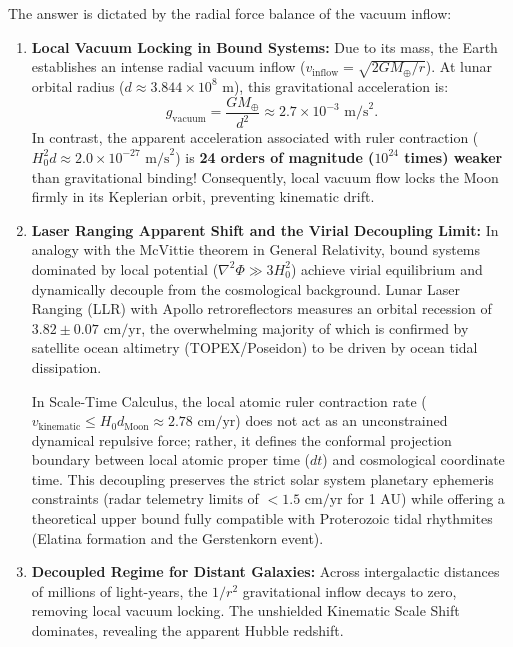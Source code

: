 \documentclass[11pt,a4paper]{article}
\begin{document}
The answer is dictated by the radial force balance of the vacuum inflow:
\begin{enumerate}
    \item \textbf{Local Vacuum Locking in Bound Systems:} Due to its mass, the Earth establishes an intense radial vacuum inflow ($v_{\mathrm{inflow}} = \sqrt{2GM_\oplus/r}$). At lunar orbital radius ($d \approx 3.844 \times 10^8\text{ m}$), this gravitational acceleration is:
          \begin{equation}
              g_{\mathrm{vacuum}} = \frac{GM_\oplus}{d^2} \approx 2.7 \times 10^{-3}\text{ m/s}^2.
          \end{equation}
          In contrast, the apparent acceleration associated with ruler contraction ($H_0^2 d \approx 2.0 \times 10^{-27}\text{ m/s}^2$) is \textbf{24 orders of magnitude ($10^{24}$ times) weaker} than gravitational binding! Consequently, local vacuum flow locks the Moon firmly in its Keplerian orbit, preventing kinematic drift.
    \item \textbf{Laser Ranging Apparent Shift and the Virial Decoupling Limit:} In analogy with the McVittie theorem in General Relativity, bound systems dominated by local potential ($\nabla^2\Phi \gg 3H_0^2$) achieve virial equilibrium and dynamically decouple from the cosmological background. Lunar Laser Ranging (LLR) with Apollo retroreflectors measures an orbital recession of $3.82 \pm 0.07\text{ cm/yr}$, the overwhelming majority of which is confirmed by satellite ocean altimetry (TOPEX/Poseidon) to be driven by ocean tidal dissipation.

          In Scale-Time Calculus, the local atomic ruler contraction rate ($v_{\mathrm{kinematic}} \le H_0 d_{\mathrm{Moon}} \approx 2.78\text{ cm/yr}$) does not act as an unconstrained dynamical repulsive force; rather, it defines the conformal projection boundary between local atomic proper time ($dt$) and cosmological coordinate time. This decoupling preserves the strict solar system planetary ephemeris constraints (radar telemetry limits of $< 1.5\text{ cm/yr}$ for 1 AU) while offering a theoretical upper bound fully compatible with Proterozoic tidal rhythmites (Elatina formation and the Gerstenkorn event).
    \item \textbf{Decoupled Regime for Distant Galaxies:} Across intergalactic distances of millions of light-years, the $1/r^2$ gravitational inflow decays to zero, removing local vacuum locking. The unshielded Kinematic Scale Shift dominates, revealing the apparent Hubble redshift.
\end{enumerate}
\end{document}

